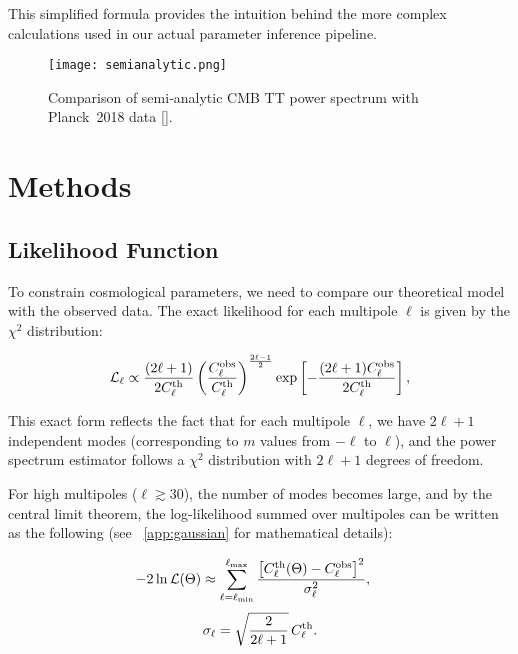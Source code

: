 \documentclass[11pt]{article}
\theoremstyle{definition}
\begin{document}
This simplified formula provides the intuition behind the more complex calculations used in our actual parameter inference pipeline.


\begin{figure}[htbp]
  \centering
  \texttt{[image: semianalytic.png]}
  \caption{Comparison of semi‑analytic CMB TT power spectrum with Planck 2018 data [\cite{planck2018}].}
  \label{fig:cmb-tt-comparison}
\end{figure}

\section{Methods}

\subsection{Likelihood Function}

To constrain cosmological parameters, we need to compare our theoretical model with the observed data. The exact likelihood for each multipole $\ell$ is given by the $\chi^2$ distribution:

\begin{equation}
  \mathcal{L}_\ell \propto \frac{(2\ell+1)}{2C_\ell^{\rm th}} 
  \left(\frac{C_\ell^{\rm obs}}{C_\ell^{\rm th}}\right)^{\frac{2\ell-1}{2}} 
  \exp\left[-\frac{(2\ell+1)C_\ell^{\rm obs}}{2C_\ell^{\rm th}}\right],
\end{equation}

This exact form reflects the fact that for each multipole $\ell$, we have $2\ell+1$ independent modes (corresponding to $m$ values from $-\ell$ to $\ell$), and the power spectrum estimator follows a $\chi^2$ distribution with $2\ell+1$ degrees of freedom. 

For high multipoles ($\ell \gtrsim 30$), the number of modes becomes large, and by the central limit theorem, the log-likelihood summed over multipoles can be written as the following (see ~\ref{app:gaussian} for mathematical details):

\begin{equation}
  -2\ln\mathcal{L}(\Theta)
  \approx \sum_{\ell=\ell_{\min}}^{\ell_{\max}}
    \frac{\bigl[C_\ell^{\rm th}(\Theta)-C_\ell^{\rm obs}\bigr]^2}
         {\sigma_\ell^2},
  \quad
\end{equation}
\begin{equation}
  \sigma_\ell = \sqrt{\frac{2}{2\ell+1}}\,C_\ell^{\rm th}.
\end{equation}
\end{document}
